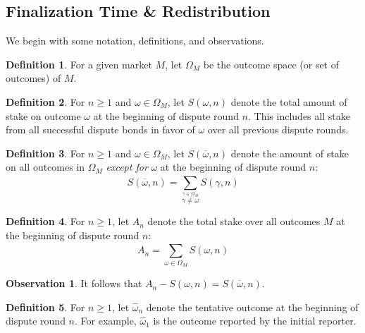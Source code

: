 \documentclass[floatfix,reprint,nofootinbib,amsmath,amssymb,epsfig,pre,floats,letterpaper,groupedaffiliation]{revtex4-1}
\theoremstyle{definition}
\newtheorem{observation}{Observation}
\theoremstyle{definition}
\newtheorem{definition}{Definition}
\begin{document}



\begin{appendix}

\cleardoublepage

\section{Finalization Time \& Redistribution}\label{section:finalization_time}

We begin with some notation, definitions, and observations.

\begin{definition}
For a given market $M$, let ${\Omega}_M$ be the outcome space (or set of outcomes) of $M$.
\end{definition}

\begin{definition}
For $n \geq 1$ and $\omega \in {\Omega}_M$,  let $S(\omega,n)$ denote the total amount of stake on outcome $\omega$ at the beginning of dispute round $n$. This includes all stake from all successful dispute bonds in favor of $\omega$ over all previous dispute rounds.
\end{definition}

\begin{definition}
For $n \geq 1$ and $\omega \in {\Omega}_M$, let $S(\overline{\omega},n)$ denote the amount of stake on all outcomes in ${\Omega}_M$ \emph{except for} $\omega$ at the beginning of dispute round $n$:
\[ S(\overline{\omega},n)= \sum_{\overset{\gamma \in {\Omega}_M}{\gamma \neq \omega}}^{} S(\gamma,n) \]
\end{definition}

\begin{definition}
For $n \ge 1$, let $A_n$ denote the total stake over all outcomes $M$ at the beginning of dispute round $n$: \[ A_n = \sum_{\omega \in {\Omega}_M}^{} S(\omega,n) \]
\end{definition}

\begin{observation}\label{ob:stake_partition}
It follows that $A_n - S(\omega,n) = S(\overline{\omega},n)$.
\end{observation}

\begin{definition}
For $n \geq 1$, let $\hat{\omega}_{n}$ denote the tentative outcome at the beginning of dispute round $n$.  For example, $\hat{\omega}_{1}$ is the outcome reported by the initial reporter.
\end{definition}


\end{appendix}
\end{document}

